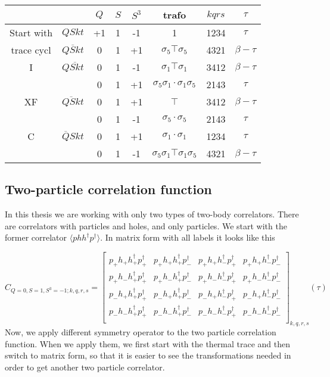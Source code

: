 \begin{table}[h]
  \centering
  \begin{tabular}{cc|cccccc}
             & & $Q$ & $S$ & $S^3$ & trafo & $kqrs$    & $\tau$  \\
  \hline
  Start with & $QSkt$ & +1 & 1 & -1 & 1 & 1234 &  $\tau$  \\
  \hline
  trace cycl & $\overline{QSkt}$ & 0 & 1 & +1 & $\sigma_5 \top \sigma_5$ & 4321 & $\beta-\tau$ \\
  \hline
  I          & $Q\overline{Sk}t$ & 0 & 1 & -1 & $\sigma_1 \top \sigma_1$ & 3412 & $\beta-\tau$ \\
             & & 0 & 1 & +1 & $\sigma_5\sigma_1\cdot\sigma_1\sigma_5$ & 2143 & $\tau$ \\
  \hline\hline
  XF         & $\overline{QSk}t$ & 0 & 1 & +1 & $\top$ & 3412 & $\beta-\tau$ \\
             & & 0 & 1 & -1 & $\sigma_5\cdot\sigma_5$ & 2143 & $\tau$ \\
  \hline
  C          & $\overline{Q}Skt$ & 0 & 1 & +1 & $\sigma_1\cdot\sigma_1$ & 1234 & $\tau$ \\
             & & 0 & 1 & -1 & $\sigma_5\sigma_1\top\sigma_1\sigma_5$ & 4321 & $\beta-\tau$
  \end{tabular}
\end{table}

\subsection{Two-particle correlation function}

In this thesis we are working with only two types of two-body correlators. There are correlators with particles and holes, and only particles. We start with the former correlator $\langle phh^\dagger p^\dagger\rangle$. In matrix form with all labels it looks like this

\newcommand{\cor}[4]{p_{#1}h_{#2}h^\dagger_{#3}p^\dagger_{#4}}
\begin{equation*}
  C_{Q=0,S=1,S^3=-1;k,q,r,s} =
  \left[
  \begin{array}{cccc}
    \cor{+}{+}{+}{+} & \cor{+}{+}{+}{-} & \cor{+}{+}{-}{+} & \cor{+}{+}{-}{-} \\
    \cor{+}{-}{+}{+} & \cor{+}{-}{+}{-} & \cor{+}{-}{-}{+} & \cor{+}{-}{-}{-} \\
    \cor{-}{+}{+}{+} & \cor{-}{+}{+}{-} & \cor{-}{+}{-}{+} & \cor{-}{+}{-}{-} \\
    \cor{-}{-}{+}{+} & \cor{-}{-}{+}{-} & \cor{-}{-}{-}{+} & \cor{-}{-}{-}{-} \\
  \end{array}
  \right]_{k,q,r,s} (\tau)
\end{equation*}
Now, we apply different symmetry operator to the two particle correlation function. When we apply them, we first start with the thermal trace and then switch to matrix form, so that it is easier to see the transformations needed in order to get another two particle correlator.
\\
\\
